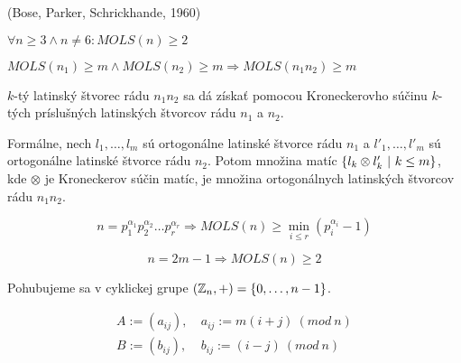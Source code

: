 \begin{theorem_hard}{(Bose, Parker, Schrickhande, 1960)}

$\forall n \geq 3 \wedge n \neq 6: MOLS(n) \geq 2$

\end{theorem_hard}

\begin{theorem}
$MOLS(n_1) \geq m \wedge MOLS(n_2) \geq m \Rightarrow MOLS(n_1 n_2) \geq m$
\end{theorem}

\begin{construction}
$k$-tý latinský štvorec rádu $n_1 n_2$ sa dá získať pomocou Kroneckerovho súčinu $k$-tých príslušných latinských štvorcov rádu $n_1$ a $n_2$.

Formálne, nech $l_1, \ldots, l_m$ sú ortogonálne latinské štvorce rádu $n_1$ a $l'_1, \ldots, l'_m$ sú ortogonálne latinské štvorce rádu $n_2$.
Potom množina matíc $\left\{l_k \otimes l'_k ~|~ k \leq m\right\}$, kde $\otimes$ je Kroneckerov súčin matíc, je množina ortogonálnych latinských štvorcov rádu $n_1 n_2$.
\end{construction}

\begin{corollary}
$$n = p_1^{\alpha_1} p_2^{\alpha_2} \ldots p_r^{\alpha_r} \Rightarrow MOLS(n) \geq \min_{i \leq r} (p_i^{\alpha_i} - 1)$$
\end{corollary}

\begin{theorem}
$$n = 2m - 1 \Rightarrow MOLS(n) \geq 2$$
\end{theorem}

\begin{construction}

Pohubujeme sa v cyklickej grupe $(\mathbb{Z}_n, +) = \left\{0, \ldots, n-1\right\}$.

\begin{align*}
A := (a_{ij}),~& a_{ij} := m (i+j)~(mod~n) \\
B := (b_{ij}),~& b_{ij} := (i-j)  ~(mod~n)    
\end{align*}
\end{construction}
